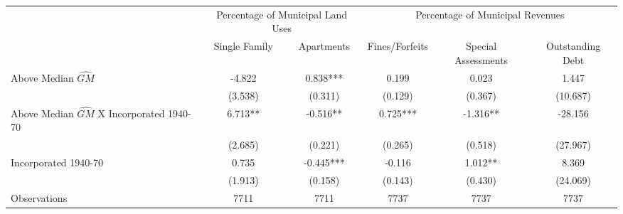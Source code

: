  \begin{tabular}{l*{5}{c}} \toprule
                    &\multicolumn{2}{c}{Percentage of Municipal Land Uses}&\multicolumn{3}{c}{Percentage of Municipal Revenues}\\\cmidrule(lr){2-3}\cmidrule(lr){4-6}
                    &\multicolumn{1}{c}{Single Family}&\multicolumn{1}{c}{Apartments}&\multicolumn{1}{c}{Fines/Forfeits}&\multicolumn{1}{c}{Special Assessments}&\multicolumn{1}{c}{Outstanding Debt}\\
\midrule
Above Median $\widehat{GM}$&      -4.822   &       0.838***&       0.199   &       0.023   &       1.447   \\
                    &     (3.538)   &     (0.311)   &     (0.129)   &     (0.367)   &    (10.687)   \\
\addlinespace
Above Median $\widehat{GM}$ X Incorporated 1940-70&       6.713** &      -0.516** &       0.725***&      -1.316** &     -28.156   \\
                    &     (2.685)   &     (0.221)   &     (0.265)   &     (0.518)   &    (27.967)   \\
\addlinespace
Incorporated 1940-70&       0.735   &      -0.445***&      -0.116   &       1.012** &       8.369   \\
                    &     (1.913)   &     (0.158)   &     (0.143)   &     (0.430)   &    (24.069)   \\
\midrule
Observations        &        7711   &        7711   &        7737   &        7737   &        7737   \\
 \bottomrule \end{tabular}
